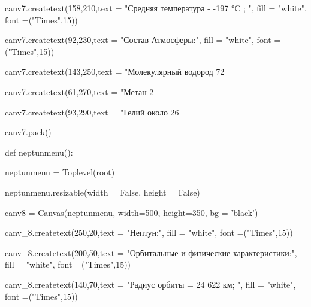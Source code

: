 \documentclass[14pt, oneside]{SavkinSeliverstov}
\begin{document}
	canv\underline{\hspace{0.2cm}}7.create\underline{\hspace{0.2cm}}text(158,210,text = "Средняя температура -  -197  °C ; ", fill = "white", font =("Times",15))

	canv\underline{\hspace{0.2cm}}7.create\underline{\hspace{0.2cm}}text(92,230,text = "Состав Атмосферы:", fill = "white", font =("Times",15))

	canv\underline{\hspace{0.2cm}}7.create\underline{\hspace{0.2cm}}text(143,250,text = "Молекулярный водород 72%

	canv\underline{\hspace{0.2cm}}7.create\underline{\hspace{0.2cm}}text(61,270,text = "Метан 2%
	
	canv\underline{\hspace{0.2cm}}7.create\underline{\hspace{0.2cm}}text(93,290,text = "Гелий около 26%

	canv\underline{\hspace{0.2cm}}7.pack()
	
def neptun\underline{\hspace{0.2cm}}menu():

	neptun\underline{\hspace{0.2cm}}menu = Toplevel(root)
	
	neptun\underline{\hspace{0.2cm}}menu.resizable(width = False, height = False)
	
	canv\underline{\hspace{0.2cm}}8 = Canvas(neptun\underline{\hspace{0.2cm}}menu, width=500, height=350, bg = 'black')

	canv_8.create\underline{\hspace{0.2cm}}text(250,20,text = "Нептун:", fill = "white", font =("Times",15))
	
	canv_8.create\underline{\hspace{0.2cm}}text(200,50,text = "Орбитальные и физические характеристики:", fill = "white", font =("Times",15))
	
	canv_8.create\underline{\hspace{0.2cm}}text(140,70,text = "Радиус орбиты =  24 622 км; ", fill = "white", font =("Times",15))
\end{document}
